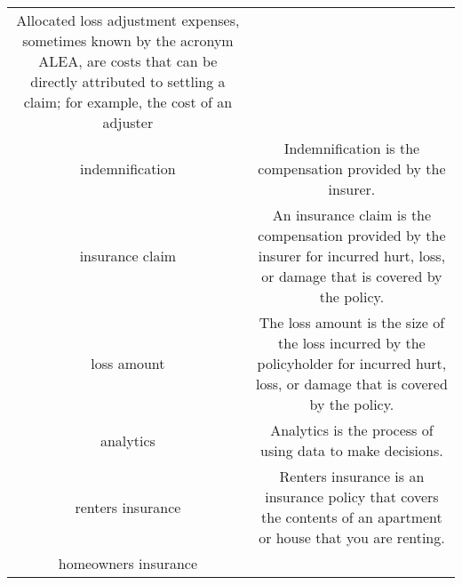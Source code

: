 \documentclass[]{book}
\theoremstyle{definition}
\theoremstyle{definition}
\theoremstyle{definition}
\theoremstyle{remark}
\begin{document}
\begin{longtable}[]{@{}cc@{}}
\begin{minipage}[t]{0.42\columnwidth}
Allocated loss adjustment expenses, sometimes known by the acronym ALEA,
are costs that can be directly attributed to settling a claim; for
example, the cost of an adjuster\strut
\end{minipage}\tabularnewline
\begin{minipage}[t]{0.39\columnwidth}\centering\strut
indemnification\strut
\end{minipage} & \begin{minipage}[t]{0.42\columnwidth}\centering\strut
Indemnification is the compensation provided by the insurer.\strut
\end{minipage}\tabularnewline
\begin{minipage}[t]{0.39\columnwidth}\centering\strut
insurance claim\strut
\end{minipage} & \begin{minipage}[t]{0.42\columnwidth}\centering\strut
An insurance claim is the compensation provided by the insurer for
incurred hurt, loss, or damage that is covered by the policy.\strut
\end{minipage}\tabularnewline
\begin{minipage}[t]{0.39\columnwidth}\centering\strut
loss amount\strut
\end{minipage} & \begin{minipage}[t]{0.42\columnwidth}\centering\strut
The loss amount is the size of the loss incurred by the policyholder for
incurred hurt, loss, or damage that is covered by the policy.\strut
\end{minipage}\tabularnewline
\begin{minipage}[t]{0.39\columnwidth}\centering\strut
analytics\strut
\end{minipage} & \begin{minipage}[t]{0.42\columnwidth}\centering\strut
Analytics is the process of using data to make decisions.\strut
\end{minipage}\tabularnewline
\begin{minipage}[t]{0.39\columnwidth}\centering\strut
renters insurance\strut
\end{minipage} & \begin{minipage}[t]{0.42\columnwidth}\centering\strut
Renters insurance is an insurance policy that covers the contents of an
apartment or house that you are renting.\strut
\end{minipage}\tabularnewline
\begin{minipage}[t]{0.39\columnwidth}\centering\strut
homeowners insurance\strut
\end{minipage} & \begin{minipage}[t]{0.42\columnwidth}\centering\strut

\end{minipage}
\end{longtable}
\end{document}
